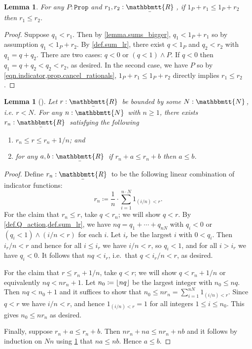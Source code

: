 \documentclass[11pt, oneside, article]{memoir}
\theoremstyle{plain}
\newtheorem{lemma}[theorem]{Lemma}
\theoremstyle{definition}
\theoremstyle{remark}
\DeclarePairedDelimiter{\floor}{\lfloor}{\rfloor}
\newcommand{\const}[1]{\mathtt{#1}}
\newcommand{\ubar}[1]{\underaccent{\bar}{#1}}
\newcommand{\ind}[1]{1_{#1}}
\newcommand{\internal}[1]{\raisebox{-.03ex}{$\mathbbmtt{#1}$}}
\newcommand{\hs}{\hspace{1.1pt}}
\newcommand{\tnn}{\internal{N}\hs}
\newcommand{\trr}{\internal{R}\hs}
\newcommand{\tlrr}{\ubar{\trr}\hs}
\newcommand{\prop}{\const{Prop}}
\begin{document}
\begin{lemma}\label{lemma.order_cancel_props}
For any $P:\prop$ and $r_1,r_2:\tlrr$, if $\ind{P}+r_1\leq \ind{P}+r_2$ then $r_1\leq r_2$.
\end{lemma}
\begin{proof}
Suppose $q_1<r_1$. Then by \cref{lemma.sums_bigger}, $q_1<\ind{P}+r_1$ so by assumption $q_1<\ind{P}+r_2$. By \cref{def.sum_lr}, there exist $q<\ind{P}$ and $q_2<r_2$ with $q_1=q+q_2$. There are two cases: $q<0$ or $(q<1)\wedge P$. If $q<0$ then $q_1=q+q_2<q_2<r_2$, as desired. In the second case, we have $P$ so by \cref{eqn.indicator,prop.cancel_rationals}, $\ind{P}+r_1\leq \ind{P}+r_2$ directly implies $r_1\leq r_2$.
\end{proof}

\begin{lemma}[\cite{henry2012simplification}]\label{lemma.cancellative_bounds}
Let $r:\tlrr$ be bounded by some $N:\tnn$, i.e. $r<N$. For any $n:\tnn$ with $n\geq 1$, there exists $r_n:\tlrr$ satisfying the following
\begin{enumerate}
	\item $r_n\leq r\leq r_n+1/n$; and
	\item for any $a,b:\tlrr$ if $r_n+a\leq r_n+b$ then $a\leq b$.
\end{enumerate}
\end{lemma}
\begin{proof}
Define $r_n:\tlrr$ to be the following linear combination of indicator functions:
\begin{equation}\label{eqn.cancellative_bounds}
r_n\coloneqq \frac{1}{n}\cdot\sum_{i=1}^{n\cdot N}\ind{(i/n)<r}.
\end{equation}
For the claim that $r_n\leq r$, take $q<r_n$; we will show $q<r$. By \cref{def.Q_action,def.sum_lr}, we have $nq=q_1+\cdots+q_{nN}$ with $q_i<0$ or $(q_i<1)\wedge (i/n<r)$ for each $i$. Let $i_r$ be the largest $i$ with $0<q_i$. Then $i_r/n<r$ and hence for all $i\leq i_r$ we have $i/n<r$, so $q_i<1$, and for all $i>i_r$ we have $q_i<0$. It follows that $nq<i_r$, i.e.\ that $q<i_r/n<r$, as desired.

For the claim that $r\leq r_n+1/n$, take $q<r$; we will show $q<r_n+1/n$ or equivalently $nq<nr_n+1$. Let $n_0\coloneqq\floor{nq}$ be the largest integer with $n_0\leq nq$. Then $nq<n_0+1$ and it suffices to show that $n_0\leq nr_n=\sum_{i=1}^{nN}\ind{(i/n)<r}$. Since $q<r$ we have $i/n<r$, and hence $\ind{(i/n)<r}=1$ for all integers $1\leq i\leq n_0$. This gives $n_0\leq nr_n$ as desired.

Finally, suppose $r_n+a\leq r_n+b$. Then $nr_n+na\leq nr_n+nb$ and it follows by induction on $Nn$ using \cref{lemma.order_cancel_props} that $na\leq nb$. Hence $a\leq b$.
\end{proof}
\end{document}
